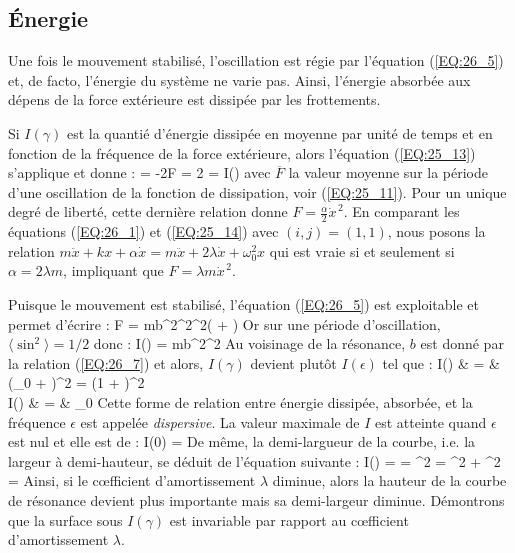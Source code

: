 \subsection{\'{E}nergie}

Une fois le mouvement stabilis\'{e}, l'oscillation est r\'{e}gie par l'\'{e}quation (\ref{EQ:26_5}) et, de facto, l'\'{e}nergie du syst\`{e}me ne varie pas. Ainsi, l'\'{e}nergie absorb\'{e}e aux d\'{e}pens de la force ext\'{e}rieure est dissip\'{e}e par les frottements.

Si $I(\gamma)$ est la quanti\'{e} d'\'{e}nergie dissip\'{e}e en moyenne par unit\'{e} de temps et en fonction de la fr\'{e}quence de la force ext\'{e}rieure, alors l'\'{e}quation (\ref{EQ:25_13}) s'applique et donne :
\benn
	 = -2F \Rightarrow {} = 2 = I(\gamma)
\eenn
avec $\overline{F}$ la valeur moyenne sur la p\'{e}riode d'une oscillation de la fonction de dissipation, voir (\ref{EQ:25_11}). Pour un unique degr\'{e} de libert\'{e}, cette derni\`{e}re relation donne $F = \frac{\alpha}{2}\dot{x}^{\,2}$. En comparant les \'{e}quations (\ref{EQ:26_1}) et (\ref{EQ:25_14}) avec $(i,j) = (1,1)$, nous posons la relation $m\ddot{x} + kx + \alpha\dot{x} = m\ddot{x} + 2\lambda\dot{x} + \omega_{0}^{2}x$ qui est vraie si et seulement si  $\alpha = 2\lambda m$, impliquant que $F = \lambda m\dot{x}^{\,2}$.

Puisque le mouvement est stabilis\'{e}, l'\'{e}quation (\ref{EQ:26_5}) est exploitable et permet d'\'{e}crire :
\benn
	F = \lambda mb^{2}\gamma^{2}\sin^{2}(\gamma{} + \delta)
\eenn
Or sur une p\'{e}riode d'oscillation, $\langle\sin^{2}\rangle = 1/2$ donc :
\be
	I(\gamma) = \lambda mb^{2}\gamma^{2} \label{EQ:26_8}
\ee
Au voisinage de la r\'{e}sonance, $b$ est donn\'{e} par la relation (\ref{EQ:26_7}) et alors, $I(\gamma)$ devient plut\^{o}t $I(\epsilon)$ tel que :
\bea
	I(\epsilon) & = & (\omega_{0} + \epsilon)^{2} = \left(1 + \right)^{2} \nonumber \\
	\Leftrightarrow I(\epsilon) & = & \epsilon \ll \omega_{0} \label{EQ:26_9}
\eea
Cette forme de relation entre \'{e}nergie dissip\'{e}e, absorb\'{e}e, et la fr\'{e}quence $\epsilon$ est appel\'{e}e \emph{dispersive}. La valeur maximale de $I$ est atteinte quand $\epsilon$ est nul et elle est de :
\benn
	I(0) = 
\eenn
De m\^{e}me, la demi-largueur de la courbe, i.e. la largeur à demi-hauteur, se d\'{e}duit de l'\'{e}quation suivante :
\benn
	I(\epsilon) =  \Leftrightarrow {} =  \lambda^{2} = \epsilon^{2} + \lambda^{2} \Leftrightarrow \epsilon = \pm \lambda
\eenn
Ainsi, si le c{\oe}fficient d'amortissement $\lambda$ diminue, alors la hauteur de la courbe de r\'{e}sonance devient plus importante mais sa demi-largeur diminue. D\'{e}montrons que la surface sous $I(\gamma)$ est invariable par rapport au c{\oe}fficient d'amortissement $\lambda$.

